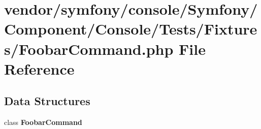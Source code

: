 \section{vendor/symfony/console/\+Symfony/\+Component/\+Console/\+Tests/\+Fixtures/\+Foobar\+Command.php File Reference}
\label{_foobar_command_8php}
\subsection*{Data Structures}
\begin{DoxyCompactItemize}
\item 
class {\bf Foobar\+Command}
\end{DoxyCompactItemize}
